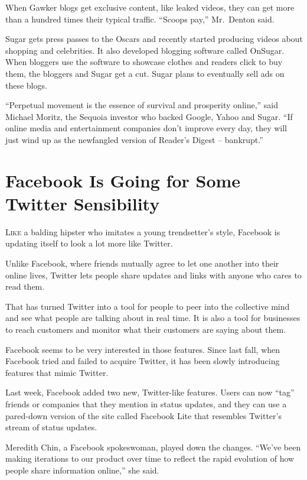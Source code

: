 ﻿\documentclass[12pt]{article}
\begin{document}
When Gawker blogs get exclusive content, like leaked videos, they can get more than a hundred times
their typical traffic. ``Scoops pay,'' Mr.~Denton said.

Sugar gets press passes to the Oscars and recently started producing videos about shopping and
celebrities. It also developed blogging software called OnSugar. When bloggers use the software to
showcase clothes and readers click to buy them, the bloggers and Sugar get a cut. Sugar plans to
eventually sell ads on these blogs.

``Perpetual\cite{perpetual} movement is the essence of survival and prosperity online,'' said
Michael Moritz, the Sequoia investor who backed Google, Yahoo and Sugar. ``If online media and
entertainment companies don't improve every day, they will just wind up as the newfangled version of
Reader's Digest -- bankrupt.''

\section{Facebook Is Going for Some Twitter Sensibility}

\lettrine{L}{ike} a balding hipster\cite{hipster} who imitates a young trendsetter's style, Facebook
is updating itself to look a lot more like Twitter.

Unlike Facebook, where friends mutually agree to let one another into their online lives, Twitter
lets people share updates and links with anyone who cares to read them.

That has turned Twitter into a tool for people to peer into the collective mind and see what people
are talking about in real time. It is also a tool for businesses to reach customers and monitor what
their customers are saying about them.

Facebook seems to be very interested in those features. Since last fall, when Facebook tried and
failed to acquire Twitter, it has been slowly introducing features that mimic\cite{mimic} Twitter.

Last week, Facebook added two new, Twitter-like features. Users can now ``tag'' friends or companies
that they mention in status updates, and they can use a pared-down version of the site called
Facebook Lite that resembles Twitter's stream of status updates.

Meredith Chin, a Facebook spokeswoman, played down the changes. ``We've been making iterations to
our product over time to reflect the rapid evolution of how people share information online,'' she
said.
\end{document}
